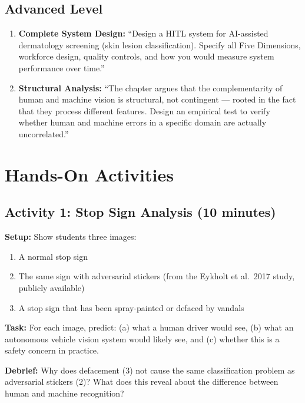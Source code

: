 \subsection{Advanced Level}

\begin{enumerate}
    \item \textbf{Complete System Design:} ``Design a HITL system for AI-assisted dermatology screening (skin lesion classification). Specify all Five Dimensions, workforce design, quality controls, and how you would measure system performance over time.''

    \item \textbf{Structural Analysis:} ``The chapter argues that the complementarity of human and machine vision is structural, not contingent --- rooted in the fact that they process different features. Design an empirical test to verify whether human and machine errors in a specific domain are actually uncorrelated.''
\end{enumerate}

\section{Hands-On Activities}

\subsection{Activity 1: Stop Sign Analysis (10 minutes)}

\textbf{Setup:} Show students three images:
\begin{enumerate}
    \item A normal stop sign
    \item The same sign with adversarial stickers (from the Eykholt et al.\ 2017 study, publicly available)
    \item A stop sign that has been spray-painted or defaced by vandals
\end{enumerate}

\textbf{Task:} For each image, predict: (a) what a human driver would see, (b) what an autonomous vehicle vision system would likely see, and (c) whether this is a safety concern in practice.

\textbf{Debrief:} Why does defacement (3) not cause the same classification problem as adversarial stickers (2)? What does this reveal about the difference between human and machine recognition?

